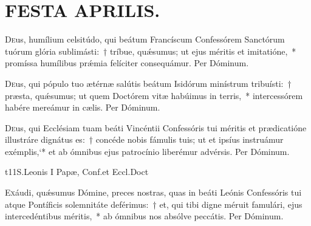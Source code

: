 \documentclass[vesperale_romanum.tex]{subfiles}
\begin{document}
\section[Festa Aprilis]{FESTA APRILIS.}

\duplex

\oratio

\lettrine{D}{e}us, humílium celsitúdo, qui beátum Francíscum Confessórem San\-ctórum tuórum glória sublimásti:~† tríbue, quǽsumus; ut ejus méritis et imitatióne,~* promíssa humílibus prǽmia felíciter consequámur.
Per Dóminum.

\quadcommferiae

\myrule
{}

\duplex

\oratio

\lettrine{D}{e}us, qui pópulo tuo ætérnæ salútis beátum Isidórum minístrum tribuísti:~† præsta, quǽsumus; ut quem Do\-ctórem vitæ habúimus in terris,~* intercessórem habére mereámur in cælis. Per Dóminum.

 \quadcommferiae
 
\capitdeseqquad

\myrule
{}

\duplex

\oratio

\lettrine{D}{e}us, qui Ecclésiam tuam beáti Vincéntii Confessóris tui méritis et prædicatióne illustráre dignátus es:~† concéde nobis fámulis tuis; ut et i\-psíus instruámur exémplis,`* et ab ó\-mnibus ejus patrocínio liberémur advérsis. Per Dóminum.


\myrule


t{11}{S.\@ Leonis I Papæ, Conf.\@ et Eccl.\@ Doct}

\duplex

\oratio

\lettrine{E}{x}áudi, quǽsumus Dómine, preces nostras, quas in beáti Leónis Confessóris tui atque Pontíficis sole\-mnitáte deférimus:~† et, qui tibi digne méruit famulári, ejus intercedéntibus méritis,~* ab ómnibus nos absólve peccátis. Per Dóminum.
\end{document}
